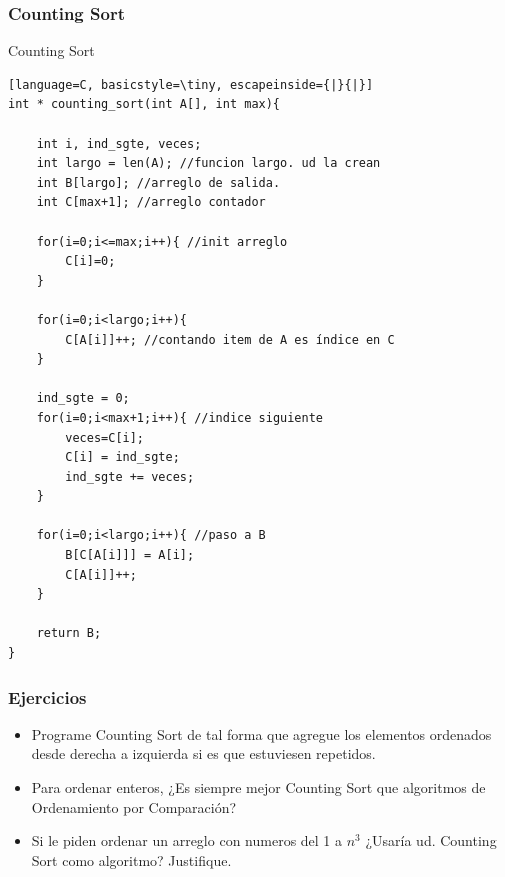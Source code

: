 \documentclass{beamer}
\begin{document}
\begin{frame}[fragile]
 \frametitle{Counting Sort}
\begin{exampleblock}{Counting Sort}
\begin{lstlisting}[language=C, basicstyle=\tiny, escapeinside={|}{|}]
int * counting_sort(int A[], int max){

	int i, ind_sgte, veces;
	int largo = len(A); //funcion largo. ud la crean
	int B[largo]; //arreglo de salida. 
	int C[max+1]; //arreglo contador

	for(i=0;i<=max;i++){ //init arreglo
		C[i]=0;
	} 

	for(i=0;i<largo;i++){
		C[A[i]]++; //contando item de A es índice en C
	}

	ind_sgte = 0;
	for(i=0;i<max+1;i++){ //indice siguiente
		veces=C[i];
		C[i] = ind_sgte;		
		ind_sgte += veces;
	}

	for(i=0;i<largo;i++){ //paso a B
		B[C[A[i]]] = A[i];
		C[A[i]]++;
	}

	return B;
}
\end{lstlisting}
\end{exampleblock}
\end{frame}



\begin{frame}[fragile]
 \frametitle{Ejercicios}
\begin{itemize}
\item Programe Counting Sort de tal forma que agregue los elementos ordenados desde derecha a izquierda si es que estuviesen repetidos.
\item Para ordenar enteros, ¿Es siempre mejor Counting Sort que algoritmos de Ordenamiento por Comparación? 
\item Si le piden ordenar un arreglo con numeros del 1 a $n^3$ ¿Usaría ud. Counting Sort como algoritmo? Justifique.  
\end{itemize}
\end{frame}
\end{document}
